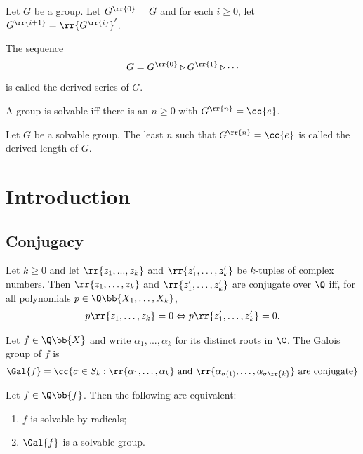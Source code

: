 \documentclass{article}
\begin{document}
\begin{definition}
  Let $G$ be a group. Let $G^{\rr{0}}=G$ and for each $i\geq 0$, let $G^{\rr{i+1}}=\rr{G^{\rr{i}}}'$.

  The sequence
  \begin{align*}
    G = G^{\rr{0}}\triangleright G^{\rr{1}}\triangleright \cdots
  \end{align*}
  is called the derived series of $G$.
\end{definition}

\begin{theorem}
  A group is solvable iff there is an $n\geq 0$ with $G^{\rr{n}}=\cc{e}$.
\end{theorem}

\begin{definition}
  Let $G$ be a solvable group. The least $n$ such that $G^{\rr{n}}=\cc{e}$ is called the
  derived length of $G$.
\end{definition}

\section{Introduction}\label{sec:introduction}

\subsection{Conjugacy}\label{sec:conjugacy}

\begin{definition}
  Let $k\geq 0$ and let $\rr{z_1,...,z_k}$ and $\rr{z'_1,\ldots,z'_k}$ be $k$-tuples
  of complex numbers. Then $\rr{z_1,\ldots,z_k}$ and $\rr{z'_1,\ldots,z'_k}$ are conjugate
  over $\Q$ iff, for all polynomials $p\in\Q\bb{X_1,\ldots,X_k}$,
  \begin{align*}
    p\rr{z_1,\ldots,z_k}=0 \Leftrightarrow p\rr{z'_1,\ldots,z'_k}=0.
  \end{align*}
\end{definition}

\begin{definition}
  Let $f\in\Q\bb{X}$ and write $\alpha_1,...,\alpha_k$ for its distinct roots in $\C$.
  The Galois group of $f$ is
  \begin{align*}
    \Gal{f}=\cc{\sigma\in S_k:\rr{\alpha_1,\ldots,\alpha_k}\text{ and }\rr{\alpha_{\sigma(1)},\ldots,\alpha_{\sigma\rr{k}}}\text{ are conjugate}}
  \end{align*}
\end{definition}

\begin{theorem}[Galois]
  Let $f\in\Q\bb{f}$. Then the following are equivalent:
  \begin{enumerate}
    \item $f$ is solvable by radicals;
    \item $\Gal{f}$ is a solvable group.
  \end{enumerate}
\end{theorem}
\end{document}
